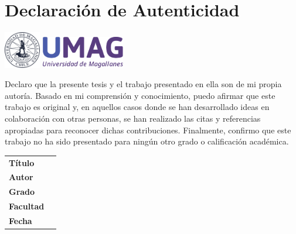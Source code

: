 \chapter{Declaración de Autenticidad}

\vspace{2cm}
\begin{flushleft}
	\includegraphics[height=1.6cm]{.cls_resources/img/umag_logo_old_blue.pdf}
	\hspace{1ex}
	\includegraphics[height=1.4cm]{.cls_resources/img/umag_logo.pdf}
\end{flushleft}
\vspace{1em}

Declaro que la presente tesis y el trabajo presentado en ella son de mi propia autoría. Basado en mi comprensión y conocimiento, puedo afirmar que este trabajo es original y, en aquellos casos donde se han desarrollado ideas en colaboración con otras personas, se han realizado las citas y referencias apropiadas para reconocer dichas contribuciones. Finalmente, confirmo que este trabajo no ha sido presentado para ningún otro grado o calificación académica.


\vspace{2.5cm}

\bgroup
\makeatletter
\def\arraystretch{1.2}%
\begin{tabular}{ll}
	{\bfseries Título}   & \@title      \\
	{\bfseries Autor}    & \@author     \\
	{\bfseries Grado}    & \@degree     \\
	{\bfseries Facultad} & \@faculty    \\[0.7in]
	{\bfseries Fecha}    & \@degreedate \\
\end{tabular}\\[1cm]
\makeatother
\egroup
